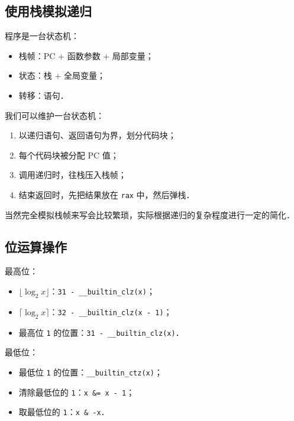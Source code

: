 \newpage

\subsection{使用栈模拟递归}

程序是一台状态机：

\begin{itemize}[noitemsep]
    \item 栈帧：PC + 函数参数 + 局部变量；
    \item 状态：栈 + 全局变量；
    \item 转移：语句．
\end{itemize}

我们可以维护一台状态机：

\begin{enumerate}[noitemsep]
    \item 以递归语句、返回语句为界，划分代码块；
    \item 每个代码块被分配 PC 值；
    \item 调用递归时，往栈压入栈帧；
    \item 结束返回时，先把结果放在 {\tt rax} 中，然后弹栈．
\end{enumerate}

当然完全模拟栈帧来写会比较繁琐，实际根据递归的复杂程度进行一定的简化．



\newpage

\subsection{位运算操作}

最高位：

\begin{itemize}[noitemsep]
    \item $\lfloor \log_2 x \rfloor$：{\tt 31 - \_\_builtin\_clz(x)}；
    \item $\lceil \log_2 x \rceil$：{\tt 32 - \_\_builtin\_clz(x - 1)}；
    \item 最高位 {\tt 1} 的位置：{\tt 31 - \_\_builtin\_clz(x)}．
\end{itemize}

最低位：

\begin{itemize}[noitemsep]
    \item 最低位 {\tt 1} 的位置：{\tt \_\_builtin\_ctz(x)}；
    \item 清除最低位的 {\tt 1}：{\tt x \&= x - 1}；
    \item 取最低位的 {\tt 1}：{\tt x \& -x}．
\end{itemize}

